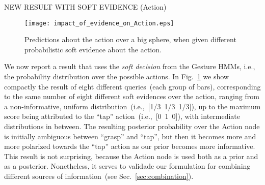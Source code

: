 \begin{figure*}
    \centering


    \caption{Object velocity predictions on a big box, given probabilistic human action information from Gesture \acp{HMM}.}
    \label{fig:effect_pred_box}
\end{figure*}

NEW RESULT WITH SOFT EVIDENCE (Action)

\begin{figure}
\centering
\texttt{[image: impact\_of\_evidence\_on\_Action.eps]}
\caption{Predictions about the action over a big sphere, when given different probabilistic soft evidence about the action.}
\label{fig:impact_of_evidence_on_Action}
\end{figure}

We now report a result that uses the \emph{soft decision} from the Gesture \acp{HMM}, i.e., the probability distribution over the possible actions.
In Fig.~\ref{fig:impact_of_evidence_on_Action} we show compactly the result of eight different queries~(each group of bars), corresponding to the same number of eight different soft evidences over the action, ranging from a non-informative, uniform distribution~(i.e.,~[1/3~1/3~1/3]), up to the maximum score being attributed to the ``tap'' action~(i.e.,~[0~1~0]), with intermediate distributions in between.
The resulting posterior probability over the Action node is initially ambiguous between ``grasp'' and ``tap'', but then it becomes more and more polarized towards the ``tap'' action as our prior becomes more informative.
This result is not surprising, because the Action node is used both as a prior and as a posterior.
Nonetheless, it serves to validade our formulation for combining different sources of information~(see Sec.~\ref{sec:combination}).

